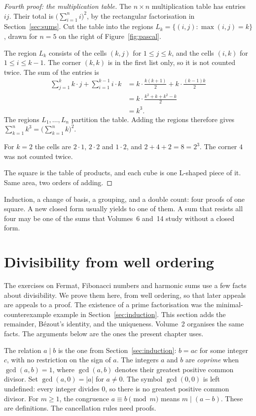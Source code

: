\begin{proof}[Fourth proof: the multiplication table]
The $n\times n$ multiplication table has entries $ij$. Their total is $\bigl(\sum_{i=1}^n i\bigr)^2$, by the rectangular factorisation in Section~\ref{sec:sums}. Cut the table into the regions $L_k=\{(i,j):\max(i,j)=k\}$, drawn for $n=5$ on the right of Figure~\ref{fig:pascal}.

The region $L_k$ consists of the cells $(k,j)$ for $1\le j\le k$, and the cells $(i,k)$ for $1\le i\le k-1$. The corner $(k,k)$ is in the first list only, so it is not counted twice. The sum of the entries is
\begin{align*}
\sum_{j=1}^k k\cdot j+\sum_{i=1}^{k-1}i\cdot k
&=k\cdot\frac{k(k+1)}{2}+k\cdot\frac{(k-1)k}{2}\\
&=k\cdot\frac{k^2+k+k^2-k}{2}\\
&=k^3.
\end{align*}
The regions $L_1,\dots,L_n$ partition the table. Adding the regions therefore gives $\sum_{k=1}^n k^3=\bigl(\sum_{k=1}^n k\bigr)^2$.

For $k=2$ the cells are $2\cdot1$, $2\cdot2$ and $1\cdot2$, and $2+4+2=8=2^3$. The corner $4$ was not counted twice.

The square is the table of products, and each cube is one L-shaped piece of it. Same area, two orders of adding.
\end{proof}

Induction, a change of basis, a grouping, and a double count: four proofs of one square. A new closed form usually yields to one of them. A sum that resists all four may be one of the sums that Volumes~6 and~14 study without a closed form.

\section{Divisibility from well ordering}\label{sec:divisibility}

The exercises on Fermat, Fibonacci numbers and harmonic sums use a few facts about divisibility. We prove them here, from well ordering, so that later appeals are appeals to a proof. The existence of a prime factorisation was the minimal-counterexample example in Section~\ref{sec:induction}. This section adds the remainder, B\'ezout's identity, and the uniqueness. Volume~2 organises the same facts. The arguments below are the ones the present chapter uses.

The relation $a\mid b$ is the one from Section~\ref{sec:induction}: $b=ac$ for some integer $c$, with no restriction on the sign of $a$. The integers $a$ and $b$ are \emph{coprime} when $\gcd(a,b)=1$, where $\gcd(a,b)$ denotes their greatest positive common divisor. Set $\gcd(a,0)=|a|$ for $a\ne0$. The symbol $\gcd(0,0)$ is left undefined: every integer divides $0$, so there is no greatest positive common divisor. For $m\ge1$, the congruence $a\equiv b\pmod m$ means $m\mid(a-b)$. These are definitions. The cancellation rules need proofs.

